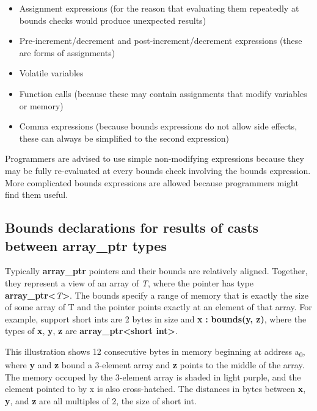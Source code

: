 \documentclass[]{article}
\begin{document}
\begin{itemize}
\item
  Assignment expressions (for the reason that evaluating them repeatedly
  at bounds checks would produce unexpected results)
\item
  Pre-increment/decrement and post-increment/decrement expressions
  (these are forms of assignments)
\item
  Volatile variables
\item
  Function calls (because these may contain assignments that modify
  variables or memory)
\item
  Comma expressions (because bounds expressions do not allow side
  effects, these can always be simplified to the second expression)
\end{itemize}

Programmers are advised to use simple non-modifying expressions because
they may be fully re-evaluated at every bounds check involving the
bounds expression. More complicated bounds expressions are allowed
because programmers might find them useful.

\subsection{\texorpdfstring{\protect\hypertarget{ux5fRef436831527}{}{\protect\hypertarget{ux5fToc437460759}{}{\protect\hypertarget{ux5fToc440445437}{}{\protect\hypertarget{ux5fToc440449219}{}{\protect\hypertarget{ux5fToc440551869}{}{\protect\hypertarget{ux5fRef435023003}{}{\protect\hypertarget{ux5fToc435434938}{}{\protect\hypertarget{ux5fToc426641073}{}{}}}}}}}}Bounds
declarations for results of casts between array\_ptr
types}{Bounds declarations for results of casts between array\_ptr types}}\label{bounds-declarations-for-results-of-casts-between-arrayux5fptr-types}

Typically \textbf{array\_ptr} pointers and their bounds are relatively
aligned. Together, they represent a view of an array of \emph{T}, where
the pointer has type
\textbf{array\_ptr\textless{}}\emph{T}\textbf{\textgreater{}}. The
bounds specify a range of memory that is exactly the size of some array
of T and the pointer points exactly at an element of that array. For
example, support short ints are 2 bytes in size and \textbf{x}
\textbf{:} \textbf{bounds(y, z)}, where the types of \textbf{x},
\textbf{y}, \textbf{z} are \textbf{array\_ptr\textless{}short
int\textgreater{}}.

This illustration shows 12 consecutive bytes in memory beginning at
address a\textsubscript{0}, where \textbf{y} and \textbf{z} bound a
3-element array and \textbf{z} points to the middle of the array. The
memory occuped by the 3-element array is shaded in light purple, and the
element pointed to by x is also cross-hatched. The distances in bytes
between \textbf{x}, \textbf{y}, and \textbf{z} are all multiples of 2,
the size of short int.
\end{document}
